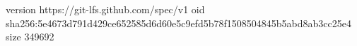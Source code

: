 version https://git-lfs.github.com/spec/v1
oid sha256:5e4673d791d429ce652585d6d60e5c9efd5b78f1508504845b5abd8ab3cc25e4
size 349692
